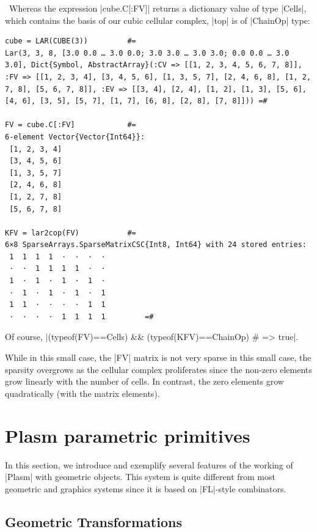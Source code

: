 \begin{coding}\
Whereas the expression |cube.C[:FV]| returns a dictionary value of type |Cells|, which contains the basis of our cubic cellular complex, |top| is of |ChainOp| type:

\begin{lstlisting}[language=JuliaLocal, style=julia, mathescape = true] 
cube = LAR(CUBE(3))			#=
Lar(3, 3, 8, [3.0 0.0 … 3.0 0.0; 3.0 3.0 … 3.0 3.0; 0.0 0.0 … 3.0 3.0], Dict{Symbol, AbstractArray}(:CV => [[1, 2, 3, 4, 5, 6, 7, 8]], :FV => [[1, 2, 3, 4], [3, 4, 5, 6], [1, 3, 5, 7], [2, 4, 6, 8], [1, 2, 7, 8], [5, 6, 7, 8]], :EV => [[3, 4], [2, 4], [1, 2], [1, 3], [5, 6], [4, 6], [3, 5], [5, 7], [1, 7], [6, 8], [2, 8], [7, 8]])) =#

FV = cube.C[:FV]			#=
6-element Vector{Vector{Int64}}:
 [1, 2, 3, 4]
 [3, 4, 5, 6]
 [1, 3, 5, 7]
 [2, 4, 6, 8]
 [1, 2, 7, 8]
 [5, 6, 7, 8]

KFV = lar2cop(FV)			#=
6×8 SparseArrays.SparseMatrixCSC{Int8, Int64} with 24 stored entries:
 1  1  1  1  ⋅  ⋅  ⋅  ⋅
 ⋅  ⋅  1  1  1  1  ⋅  ⋅
 1  ⋅  1  ⋅  1  ⋅  1  ⋅
 ⋅  1  ⋅  1  ⋅  1  ⋅  1
 1  1  ⋅  ⋅  ⋅  ⋅  1  1
 ⋅  ⋅  ⋅  ⋅  1  1  1  1			=#
\end{lstlisting}
Of course, |(typeof(FV)==Cells) && (typeof(KFV)==ChainOp) # => true|.
\end{coding}

\begin{remark}
While in this small case, the |FV| matrix is not very sparse in this small case, the sparsity overgrows as the cellular complex proliferates since the non-zero elements grow linearly with the number of cells. In contrast, the zero elements grow quadratically (with the matrix elements).
\end{remark}


\section{Plasm parametric primitives}\label{sect:4-2}

In this section, we introduce and exemplify several features of the working of |Plasm| with geometric objects. This system is quite different from most geometric and graphics systems since it is based on |FL|-style combinators.


\subsection{Geometric Transformations}\label{sect:4-2-1}

